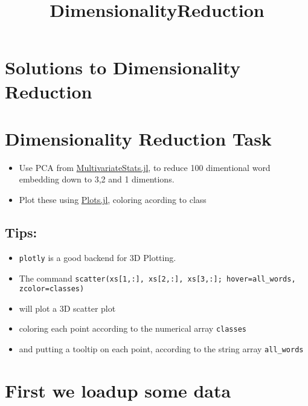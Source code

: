 \documentclass[11pt]{article}
\title{DimensionalityReduction}
\begin{document}
    
    
    \maketitle
    
    

    
    \section{Solutions to Dimensionality
Reduction}\label{solutions-to-dimensionality-reduction}

\section{Dimensionality Reduction
Task}\label{dimensionality-reduction-task}

\begin{itemize}
\itemsep1pt\parskip0pt
\item
  Use PCA from
  \href{https://github.com/JuliaStats/MultivariateStats.jl}{MultivariateStats.jl},
  to reduce 100 dimentional word embedding down to 3,2 and 1 dimentions.
\item
  Plot these using
  \href{https://github.com/tbreloff/Plots.jl}{Plots.jl}, coloring
  acording to class
\end{itemize}

\subsection{Tips:}\label{tips}

\begin{itemize}
\itemsep1pt\parskip0pt
\item
  \texttt{plotly} is a good backend for 3D Plotting.
\item
  The command
  \texttt{scatter(xs{[}1,:{]}, xs{[}2,:{]}, xs{[}3,:{]}; hover=all\_words, zcolor=classes)}
\item
  will plot a 3D scatter plot
\item
  coloring each point according to the numerical array \texttt{classes}
\item
  and putting a tooltip on each point, according to the string array
  \texttt{all\_words}
\end{itemize}

    \section{First we loadup some data}\label{first-we-loadup-some-data}
\end{document}
